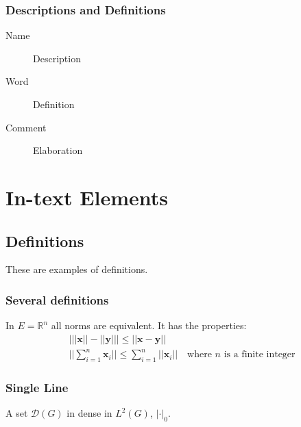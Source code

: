\documentclass{udc-book}
\begin{document}
\subsection{Descriptions and Definitions}

\begin{description}
\item[Name] Description
\item[Word] Definition
\item[Comment] Elaboration
\end{description}



\chapter{In-text Elements}

\section{Definitions}

These are examples of definitions.

\subsection{Several definitions}

\begin{definition}
In $E=\mathbb{R}^n$ all norms are equivalent. It has the properties:
\begin{align}
& \big| ||\mathbf{x}|| - ||\mathbf{y}|| \big|\leq || \mathbf{x}- \mathbf{y}||\\
&  ||\sum_{i=1}^n\mathbf{x}_i||\leq \sum_{i=1}^n||\mathbf{x}_i||\quad\text{where $n$ is a finite integer}
\end{align}
\end{definition}

\subsection{Single Line}

\begin{definition}[Name]
A set $\mathcal{D}(G)$ in dense in $L^2(G)$, $|\cdot|_0$. 
\end{definition}
\end{document}
